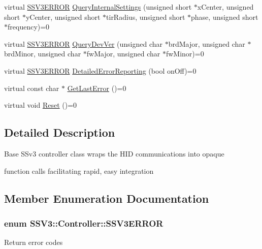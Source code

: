 \begin{DoxyCompactItemize}
\item 
virtual \hyperlink{classSSV3_1_1Controller_a8ff24a92ec373aa1257dcfe2aa2e5406}{S\-S\-V3\-E\-R\-R\-O\-R} \hyperlink{classSSV3_1_1Controller_a3208aca4a9d3ee6bdf0643b22a1f6e67}{Query\-Internal\-Settings} (unsigned short $\ast$x\-Center, unsigned short $\ast$y\-Center, unsigned short $\ast$tir\-Radius, unsigned short $\ast$phase, unsigned short $\ast$frequency)=0
\item 
virtual \hyperlink{classSSV3_1_1Controller_a8ff24a92ec373aa1257dcfe2aa2e5406}{S\-S\-V3\-E\-R\-R\-O\-R} \hyperlink{classSSV3_1_1Controller_a52d3025e408a6e502a72c5bb522e3de3}{Query\-Dev\-Ver} (unsigned char $\ast$brd\-Major, unsigned char $\ast$brd\-Minor, unsigned char $\ast$fw\-Major, unsigned char $\ast$fw\-Minor)=0
\item 
virtual \hyperlink{classSSV3_1_1Controller_a8ff24a92ec373aa1257dcfe2aa2e5406}{S\-S\-V3\-E\-R\-R\-O\-R} \hyperlink{classSSV3_1_1Controller_ab74e7164b2640607140e19a98fc6ac63}{Detailed\-Error\-Reporting} (bool on\-Off)=0
\item 
virtual const char $\ast$ \hyperlink{classSSV3_1_1Controller_a1983242e211ad34cacc91a4e38d42f13}{Get\-Last\-Error} ()=0
\item 
virtual void \hyperlink{classSSV3_1_1Controller_ae3f168a6e03c1bf9dec1df16dd83d113}{Reset} ()=0
\end{DoxyCompactItemize}


\subsection{Detailed Description}
Base S\-Sv3 controller class wraps the H\-I\-D communications into opaque\par
function calls facilitating rapid, easy integration 

\subsection{Member Enumeration Documentation}
\hypertarget{classSSV3_1_1Controller_a8ff24a92ec373aa1257dcfe2aa2e5406}{
\subsubsection[{S\-S\-V3\-E\-R\-R\-O\-R}]{\setlength{\rightskip}{0pt plus 5cm}enum {\bf S\-S\-V3\-::\-Controller\-::\-S\-S\-V3\-E\-R\-R\-O\-R}\hspace{0.3cm}{\ttfamily [strong]}}}\label{classSSV3_1_1Controller_a8ff24a92ec373aa1257dcfe2aa2e5406}
Return error codes 

